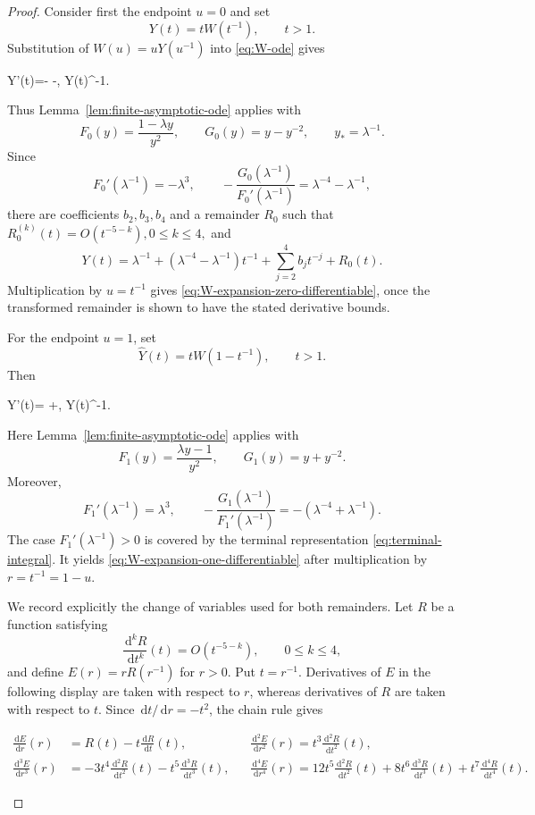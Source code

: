 \documentclass[a4paper,fleqn]{cas-sc}
\numberwithin{equation}{section}
\theoremstyle{plain}
\theoremstyle{definition}
\newcommand{\dd}{\,\mathrm d}
\begin{document}
\begin{proof}
Consider first the endpoint $u=0$ and set
\[
 Y(t)=tW(t^{-1}),
 \qquad t>1.
\]
Substitution of $W(u)=uY(u^{-1})$ into \eqref{eq:W-ode} gives
\begin{revequation}
 Y'(t)=-
       -,
 \qquad
 Y(t)\longrightarrow \lambda^{-1}.
\end{revequation}
Thus Lemma~\ref{lem:finite-asymptotic-ode} applies with
\[
 F_0(y)=\frac{1-\lambda y}{y^2},
 \qquad
 G_0(y)=y-y^{-2},
 \qquad
 y_*=\lambda^{-1}.
\]
Since
\[
 F_0'(\lambda^{-1})=-\lambda^3,
 \qquad
 -\frac{G_0(\lambda^{-1})}{F_0'(\lambda^{-1})}
 =\lambda^{-4}-\lambda^{-1},
\]
there are coefficients $b_2,b_3,b_4$ and a remainder $R_0$ such that
\(
 R_0^{(k)}(t)=O(t^{-5-k}),
 0\le k\le4,
\)
and
\[
 Y(t)=\lambda^{-1}
 +\left(\lambda^{-4}-\lambda^{-1}\right)t^{-1}
 +\sum_{j=2}^4b_jt^{-j}+R_0(t).
\]
Multiplication by $u=t^{-1}$ gives
\eqref{eq:W-expansion-zero-differentiable}, once the transformed remainder
is shown to have the stated derivative bounds.

For the endpoint $u=1$, set
\[
 \widehat Y(t)=tW(1-t^{-1}),
 \qquad t>1.
\]
Then
\begin{revequation}
 \widehat Y'(t)=
 +,
 \qquad
 \widehat Y(t)\longrightarrow\lambda^{-1}.
\end{revequation}
Here Lemma~\ref{lem:finite-asymptotic-ode} applies with
\[
 F_1(y)=\frac{\lambda y-1}{y^2},
 \qquad
 G_1(y)=y+y^{-2}.
\]
Moreover,
\[
 F_1'(\lambda^{-1})=\lambda^3,
 \qquad
 -\frac{G_1(\lambda^{-1})}{F_1'(\lambda^{-1})}
 =-(\lambda^{-4}+\lambda^{-1}).
\]
The case $F_1'(\lambda^{-1})>0$ is covered by the terminal representation
\eqref{eq:terminal-integral}.  It yields
\eqref{eq:W-expansion-one-differentiable} after multiplication by
$r=t^{-1}=1-u$.

We record explicitly the change of variables used for both remainders.  Let
$R$ be a function satisfying
\[
 \frac{\dd^kR}{\dd t^k}(t)=O(t^{-5-k}),
 \qquad 0\le k\le4,
\]
and define $E(r)=rR(r^{-1})$ for $r>0$.  Put $t=r^{-1}$.
Derivatives of $E$ in the following display are taken with respect to $r$,
whereas derivatives of $R$ are taken with respect to $t$.  Since
$\dd t/\dd r=-t^2$, the chain rule gives
\begin{samepage}
 \begin{align*}
  \frac{\dd E}{\dd r}(r)&=R(t)-t\frac{\dd R}{\dd t}(t),
 &&\frac{\dd^2E}{\dd r^2}(r)=t^3\frac{\dd^2R}{\dd t^2}(t), \\
  \frac{\dd^3E}{\dd r^3}(r)&=-3t^4\frac{\dd^2R}{\dd t^2}(t)-t^5\frac{\dd^3R}{\dd t^3}(t),
  &&\frac{\dd^4E}{\dd r^4}(r)=12t^5\frac{\dd^2R}{\dd t^2}(t)+8t^6\frac{\dd^3R}{\dd t^3}(t)+t^7\frac{\dd^4R}{\dd t^4}(t).
\end{align*}
\end{samepage}


\end{proof}
\end{document}
